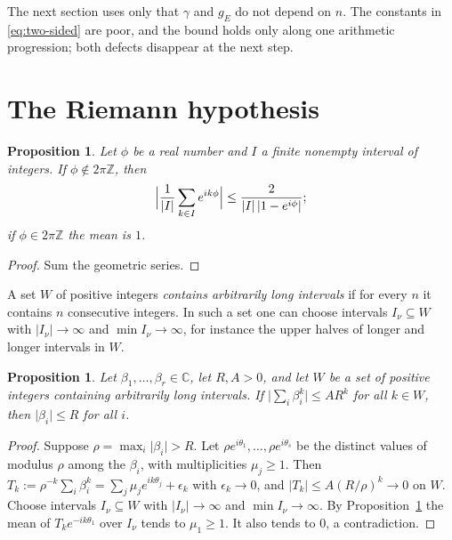 \documentclass[11pt]{amsbook}
\theoremstyle{plain}
\newtheorem{proposition}[theorem]{Proposition}
\theoremstyle{definition}
\theoremstyle{remark}
\numberwithin{equation}{section}
\numberwithin{figure}{chapter}
\numberwithin{table}{chapter}
\newcommand{\Z}{\mathbb{Z}}
\renewcommand{\C}{\mathbb{C}}
\begin{document}
The next section uses only that $\gamma$ and $g_E$ do not depend on
$n$. The constants in \eqref{eq:two-sided} are poor, and the bound
holds only along one arithmetic progression; both defects disappear
at the next step.

\section{The Riemann hypothesis}
\label{sec:rh}

\begin{proposition}\label{prop:mean-values}
Let $\phi$ be a real number and $I$ a finite nonempty interval of
integers. If $\phi\notin2\pi\Z$, then
\[
\Bigl\lvert\frac1{\lvert I\rvert}\sum_{k\in I}e^{ik\phi}\Bigr\rvert
\le\frac{2}{\lvert I\rvert\,\lvert1-e^{i\phi}\rvert};
\]
if $\phi\in2\pi\Z$ the mean is $1$.
\end{proposition}

\begin{proof}
Sum the geometric series.
\end{proof}

A set $W$ of positive integers \emph{contains arbitrarily long
intervals} if for every $n$ it contains $n$ consecutive integers.
In such a set one can choose intervals $I_\nu\subseteq W$ with
$\lvert I_\nu\rvert\to\infty$ and $\min I_\nu\to\infty$, for
instance the upper halves of longer and longer intervals in $W$.

\begin{proposition}\label{prop:power-sums}
Let $\beta_1,\dots,\beta_r\in\C$, let $R,A>0$, and let $W$ be a set
of positive integers containing arbitrarily long intervals. If
$\lvert\sum_i\beta_i^k\rvert\le AR^k$ for all $k\in W$, then
$\lvert\beta_i\rvert\le R$ for all $i$.
\end{proposition}

\begin{proof}
Suppose $\rho=\max_i\lvert\beta_i\rvert>R$. Let
$\rho e^{i\theta_1},\dots,\rho e^{i\theta_s}$ be the distinct
values of modulus $\rho$ among the $\beta_i$, with multiplicities
$\mu_j\ge1$. Then
$T_k:=\rho^{-k}\sum_i\beta_i^k
=\sum_j\mu_je^{ik\theta_j}+\epsilon_k$
with $\epsilon_k\to0$, and
$\lvert T_k\rvert\le A(R/\rho)^k\to0$ on $W$. Choose intervals
$I_\nu\subseteq W$ with $\lvert I_\nu\rvert\to\infty$ and
$\min I_\nu\to\infty$. By Proposition~\ref{prop:mean-values} the
mean of $T_ke^{-ik\theta_1}$ over $I_\nu$ tends to $\mu_1\ge1$. It
also tends to $0$, a contradiction.
\end{proof}
\end{document}
